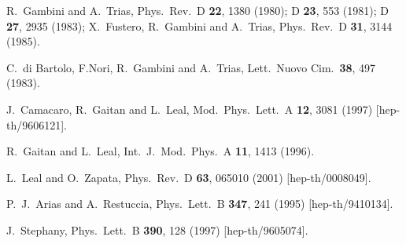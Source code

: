 \documentclass[a4paper,12pt]{article}
\begin{document}
\begin{thebibliography}{25}
 R.~Gambini and A.~Trias,
Phys.\ Rev.\ D {\bf 22}, 1380 (1980);
D {\bf 23}, 553 (1981);
D {\bf 27}, 2935 (1983);
X.~Fustero, R.~Gambini and A.~Trias,
Phys.\ Rev.\ D {\bf 31}, 3144 (1985).

 C.~di Bartolo, F.Nori, R.~Gambini and A.~Trias,
Lett.\ Nuovo Cim.\  {\bf 38}, 497 (1983).

 J.~Camacaro, R.~Gaitan and L.~Leal,
Mod.\ Phys.\ Lett.\ A {\bf 12}, 3081 (1997)
[hep-th/9606121].

 R.~Gaitan and L.~Leal,
Int.\ J.\ Mod.\ Phys.\ A {\bf 11}, 1413 (1996).


 L.~Leal and O.~Zapata,
Phys.\ Rev.\ D {\bf 63}, 065010 (2001)
[hep-th/0008049].


 P.~J.~Arias and A.~Restuccia,
Phys.\ Lett.\ B {\bf 347}, 241 (1995)
[hep-th/9410134].

 J.~Stephany,
Phys.\ Lett.\ B {\bf 390}, 128 (1997)
[hep-th/9605074].






\end{thebibliography}
\end{document}
